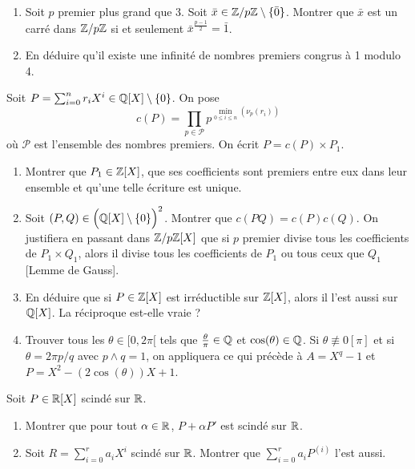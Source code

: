 \begin{exercise}
	\phantom{}
	\begin{enumerate}
		\item
		Soit $p$ premier plus grand que 3. Soit
		$\bar{x}\in\mathbb{Z}/p\mathbb{Z}\setminus\{\bar{0}\}$. Montrer que $\bar{x}$ est un carré
		dans $\mathbb{Z}/p\mathbb{Z}$ si et seulement $\bar{x}^{\frac{p-1}{2}}=\bar{1}$.
		\item
		En déduire qu'il existe une infinité de nombres premiers congrus à 1
		modulo 4.
	\end{enumerate}
\end{exercise}

\begin{exercise}
	Soit $P=\sum_{i=0}^{n}r_{i}X^{i}\in\mathbb{Q}[X]\setminus\{0\}$. On pose
	$$c(P)=\prod_{p\in\mathcal{P}}p^{\min\limits_{0\leqslant i\leqslant
	n}(\nu_{p}(r_{i}))}$$ où $\mathcal{P}$ est l'ensemble des nombres premiers. On
	écrit $P=c(P)\times P_{1}$.
	\begin{enumerate}
		\item
		Montrer que $P_{1}\in\mathbb{Z}[X]$, que ses coefficients sont premiers entre eux
		dans leur ensemble et qu'une telle écriture est unique.
		\item
		Soit $(P,Q)\in \Bigl(\mathbb{Q}[X]\setminus\{0\}\Bigr)^{2}$. Montrer que
		$c(PQ)=c(P)c(Q)$. On justifiera en passant dans $\mathbb{Z}/p\mathbb{Z}[X]$ que si $p$
		premier divise tous les coefficients de $P_{1}\times Q_{1}$, alors il
		divise tous les coefficients de $P_{1}$ ou tous ceux que $Q_{1}$ [Lemme de
		Gauss].
		\item
		En déduire que si $P\in\mathbb{Z}[X]$ est irréductible sur $\mathbb{Z}[X]$, alors il l'est
		aussi sur $\mathbb{Q}[X]$. La réciproque est-elle vraie ?
		\item
		Trouver tous les $\theta\in[0,2\pi[$ tels que $\frac{\theta}{\pi}\in\mathbb{Q}$ et
		$\cos(\theta)\in\mathbb{Q}$. Si $\theta\not\equiv0[\pi]$ et si $\theta=2\pi p/q$
		avec $p\wedge q=1$, on appliquera ce qui précède à $A=X^{q}-1$ et
		$P=X^{2}-(2\cos(\theta))X+1$.
	\end{enumerate}
\end{exercise}

\begin{exercise}
	Soit $P\in\mathbb{R}[X]$ scindé sur $\mathbb{R}$.
	\begin{enumerate}
		\item
		Montrer que pour tout $\alpha\in\mathbb{R}$, $P+\alpha P'$ est scindé sur $\mathbb{R}$.
		\item
		Soit $R=\sum_{i=0}^{r}a_{i}X^{i}$ scindé sur $\mathbb{R}$. Montrer que
		$\sum_{i=0}^{r}a_{i}P^{(i)}$ l'est aussi.
	\end{enumerate}
\end{exercise}

